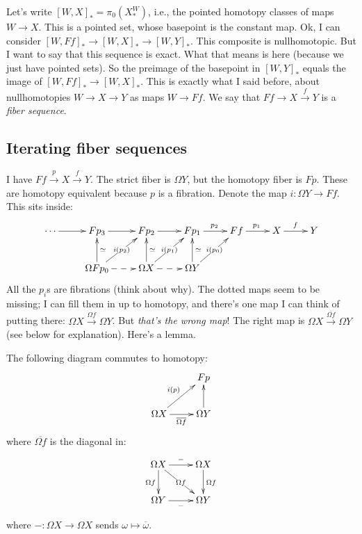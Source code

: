 Let's write $[W,X]_\ast = \pi_0(X^W_\ast)$, i.e., the pointed homotopy classes of maps $W\to X$. This is a pointed set, whose basepoint is the constant map. Ok, I can consider $[W,Ff]_\ast\to [W,X]_\ast\to [W,Y]_\ast$. This composite is nullhomotopic. But I want to say that this sequence is exact. What that means is here (because we just have pointed sets). So the preimage of the basepoint in $[W,Y]_\ast$ equals the image of $[W,Ff]_\ast\to [W,X]_\ast$. This is exactly what I said before, about nullhomotopies $W\to X\to Y$ as maps $W\to Ff$. We say that $Ff\to X\xrightarrow{f}Y$ is a \emph{fiber sequence}.

\subsection{Iterating fiber sequences}
I have $Ff\xrightarrow{p} X\xrightarrow{f} Y$. The strict fiber is $\Omega Y$, but the homotopy fiber is $Fp$. These are homotopy equivalent because $p$ is a fibration. Denote the map $i:\Omega Y\to Ff$. This sits inside:
\begin{equation*}
    \xymatrix{
	\cdots\ar[r] & Fp_3 \ar[r] & Fp_2\ar[r] & Fp_1\ar[r]^{p_2} & Ff\ar[r]^{p_1} & X\ar[r]^{f} & Y\\
	& \Omega Fp_0\ar[u]_{\simeq}\ar[ur]|{i(p_2)}\ar@{-->}[r] & \Omega X\ar@{-->}[r]\ar[u]_{\simeq}\ar[ur]|{i(p_1)} & \Omega Y\ar[u]_\simeq \ar[ur]|{i(p_0)} & &
    }
\end{equation*}
All the $p_i$s are fibrations (think about why). The dotted maps seem to be missing; I can fill them in up to homotopy, and there's one map I can think of putting there: $\Omega X\xrightarrow{\Omega f}\Omega Y$. But \emph{that's the wrong map}! The right map is $\Omega X\xrightarrow{\overline{\Omega f}}\Omega Y$ (see below for explanation). Here's a lemma.
\begin{lemma}
    The following diagram commutes to homotopy:
    \begin{equation*}
	\xymatrix{
	    & Fp\\
	    \Omega X\ar[r]_{\overline{\Omega f}}\ar[ur]^{i(p)} & \Omega Y\ar[u]
	    }
    \end{equation*}
    where $\overline{\Omega f}$ is the diagonal in:
    \begin{equation*}
	\xymatrix{
	    \Omega X\ar[r]^{-}\ar[dr]|{\Omega f} \ar[d]_{\Omega f} & \Omega X\ar[d]^{\Omega f}\\
	    \Omega Y\ar[r]_{-} & \Omega Y
	    }
    \end{equation*}
    where $-:\Omega X\to \Omega X$ sends $\omega\mapsto\overline{\omega}$.
\end{lemma}
